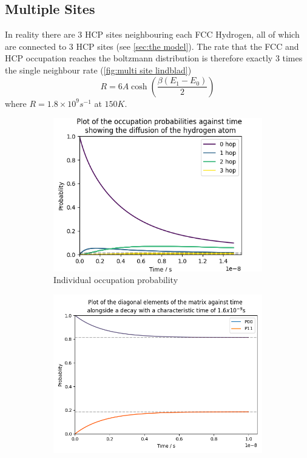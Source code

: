\subsection{Multiple Sites}
In reality there
are 3 HCP sites neighbouring
each FCC Hydrogen, all of which
are connected to \(3\) HCP sites
(see \cref{sec:the model}).
The rate that the FCC
and HCP
occupation reaches the
boltzmann distribution
is therefore exactly \(3\)
times the single neighbour rate
(\cref{fig:multi site lindblad})
\begin{equation}
    R = 6A\cosh{(\frac{\beta (E_1 - E_0)}{2})}
\end{equation}
where \(R=1.8\times{}10^{9}s^{-1}\) at
\(150K\).
\begin{figure}[htbp]
    \centering
    \begin{subfigure}{0.45\linewidth}
        \centering
        \includegraphics[width =0.9 \linewidth]{Figures/Redfield/Plot of lindblad solution many sites.png}
        \caption{Individual occupation probability
        }\label{sub@fig:multi site lindblad}
    \end{subfigure}
    \hfill
    \begin{subfigure}{0.45\linewidth}
        \centering
        \includegraphics[width = 0.9\linewidth]{Figures/Redfield/Plot of redfield solution long time.png}

\end{subfigure}
\end{figure}
